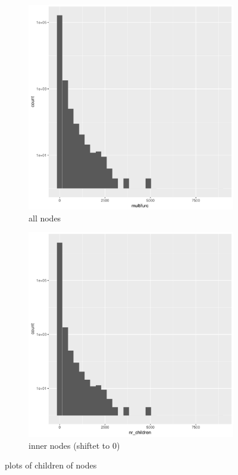       \begin{figure}[h!]
        \begin{subfigure}{.5\textwidth}
          \centering
          \includegraphics[width=.8\linewidth]{Figures/multifurc.pdf}
          \caption{all nodes}
          \label{fig:childrenOfNodes_allNodes}
        \end{subfigure}%
        \begin{subfigure}{.5\textwidth}
          \centering
          \includegraphics[width=.8\linewidth]{Figures/nr_children.pdf}
          \caption{inner nodes (shiftet to 0)}
          \label{fig:childrenOfNodes_innerNodes}
        \end{subfigure}
        \caption{plots of children of nodes}
        \label{fig:childrenOfNodes}
      \end{figure}

